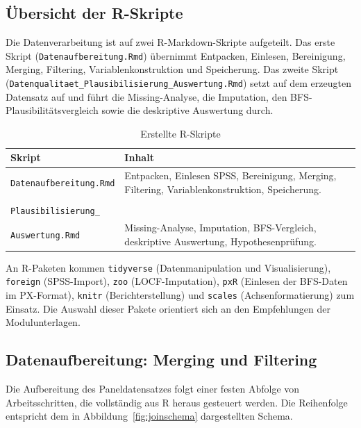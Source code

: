\subsection{Übersicht der R-Skripte}
\label{subsec:rskripte}

Die Datenverarbeitung ist auf zwei R-Markdown-Skripte aufgeteilt. Das erste Skript
(\texttt{Datenaufbereitung.Rmd}) übernimmt Entpacken, Einlesen, Bereinigung, Merging,
Filtering, Variablenkonstruktion und Speicherung. Das zweite Skript
(\texttt{Datenqualitaet\_\allowbreak Plausibilisierung\_\allowbreak Auswertung.Rmd}) setzt auf dem erzeugten
Datensatz auf und führt die Missing-Analyse, die Imputation, den
BFS-Plausibilitätsvergleich sowie die deskriptive Auswertung durch.

\begin{table}[h]
\centering
\caption{Erstellte R-Skripte}
\label{tab:rskripte}
\begin{tabularx}{\textwidth}{lX}
\toprule
Skript & Inhalt \\
\midrule
\texttt{Datenaufbereitung.Rmd} & Entpacken, Einlesen SPSS, Bereinigung, Merging, Filtering, Variablenkonstruktion, Speicherung. \\[4pt]
\makecell[l]{\texttt{Datenqualitaet\_} \\ \texttt{Plausibilisierung\_} \\ \texttt{Auswertung.Rmd}} & Missing-Analyse, Imputation, BFS-Vergleich, deskriptive Auswertung, Hypothesenprüfung. \\
\bottomrule
\end{tabularx}
\end{table}

An R-Paketen kommen \texttt{tidyverse} (Datenmanipulation und Visualisierung),
\texttt{foreign} (SPSS-Import), \texttt{zoo} (LOCF-Imputation), \texttt{pxR} (Einlesen
der BFS-Daten im PX-Format), \texttt{knitr} (Berichterstellung) und \texttt{scales}
(Achsenformatierung) zum Einsatz. Die Auswahl dieser Pakete orientiert sich an den
Empfehlungen der Modulunterlagen.



\subsection{Datenaufbereitung: Merging und Filtering}
\label{subsec:merging}

Die Aufbereitung des Paneldatensatzes folgt einer festen Abfolge von Arbeitsschritten,
die vollständig aus R heraus gesteuert werden. Die Reihenfolge entspricht dem in
Abbildung~\ref{fig:joinschema} dargestellten Schema.

